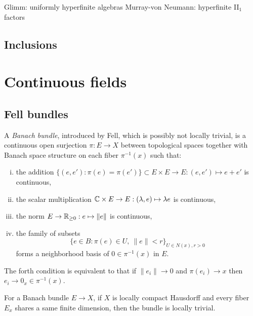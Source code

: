 \documentclass{../../large}
\begin{document}
Glimm: uniformly hyperfinite algebras
Murray-von Neumann: hyperfinite II$_1$ factors




\section{Inclusions}










\chapter{Continuous fields}


\section{Fell bundles}

\begin{prb}
A \emph{Banach bundle}, introduced by Fell, which is possibly not locally trivial, is a continuous open surjection $\pi:E\to X$ between topological spaces together with Banach space structure on each fiber $\pi^{-1}(x)$ such that:
\begin{enumerate}[(i)]
\item the addition $\{(e,e'):\pi(e)=\pi(e')\}\subset E\times E\to E:(e,e')\mapsto e+e'$ is continuous,
\item the scalar multiplication $\mathbb{C}\times E\to E:(\lambda,e)\mapsto\lambda e$ is continuous,
\item the norm $E\to\mathbb{R}_{\ge0}:e\mapsto\|e\|$ is continuous,
\item the family of subsets
\[\{e\in B:\pi(e)\in U,\ \|e\|<r\}_{U\in N(x),r>0}\]
forms a neighborhood basis of $0\in\pi^{-1}(x)$ in $E$.
\end{enumerate}
The forth condition is equivalent to that if $\|e_i\|\to0$ and $\pi(e_i)\to x$ then $e_i\to 0_x\in\pi^{-1}(x)$.
\begin{parts}
\item For a Banach bundle $E\to X$, if $X$ is locally compact Hausdorff and every fiber $E_x$ shares a same finite dimension, then the bundle is locally trivial.
\end{parts}
\end{prb}


\begin{prb}
\end{prb}
\end{document}
